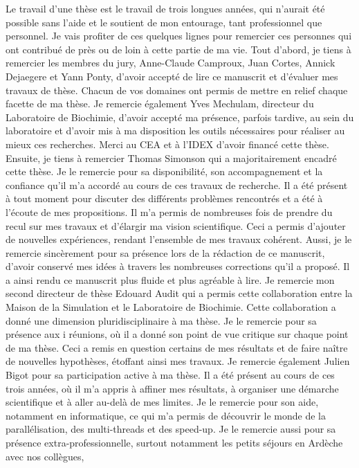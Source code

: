 Le travail d’une thèse est le travail de trois longues années, qui n’aurait été possible
sans l’aide et le soutient de mon entourage, tant professionnel que personnel. Je vais
profiter de ces quelques lignes pour remercier ces personnes qui ont contribué de près ou
de loin à cette partie de ma vie.
Tout d’abord, je tiens à remercier les membres du jury, Anne-Claude Camproux, Juan
Cortes, Annick Dejaegere et Yann Ponty, d’avoir accepté de lire ce manuscrit et d’évaluer
mes travaux de thèse. Chacun de vos domaines ont permis de mettre en relief chaque
facette de ma thèse. Je remercie également Yves Mechulam, directeur du Laboratoire de
Biochimie, d’avoir accepté ma présence, parfois tardive, au sein du laboratoire et d’avoir
mis à ma disposition les outils nécessaires pour réaliser au mieux ces recherches. Merci au
CEA et à l’IDEX d’avoir financé cette thèse.
Ensuite, je tiens à remercier Thomas Simonson qui a majoritairement encadré cette
thèse. Je le remercie pour sa disponibilité, son accompagnement et la confiance qu’il
m’a accordé au cours de ces travaux de recherche. Il a été présent à tout moment pour
discuter des différents problèmes rencontrés et a été à l’écoute de mes propositions. Il
m’a permis de nombreuses fois de prendre du recul sur mes travaux et d’élargir ma vision
scientifique. Ceci a permis d’ajouter de nouvelles expériences, rendant l’ensemble de mes
travaux cohérent. Aussi, je le remercie sincèrement pour sa présence lors de la rédaction
de ce manuscrit, d’avoir conservé mes idées à travers les nombreuses corrections qu’il a
proposé. Il a ainsi rendu ce manuscrit plus fluide et plus agréable à lire.
Je remercie mon second directeur de thèse Edouard Audit qui a permis cette collaboration
entre la Maison de la Simulation et le Laboratoire de Biochimie. Cette collaboration
a donné une dimension pluridisciplinaire à ma thèse. Je le remercie pour sa présence aux
i
réunions, où il a donné son point de vue critique sur chaque point de ma thèse. Ceci a
remis en question certains de mes résultats et de faire naître de nouvelles hypothèses,
étoffant ainsi mes travaux.
Je remercie également Julien Bigot pour sa participation active à ma thèse. Il a été
présent au cours de ces trois années, où il m’a appris à affiner mes résultats, à organiser
une démarche scientifique et à aller au-delà de mes limites. Je le remercie pour
son aide, notamment en informatique, ce qui m’a permis de découvrir le monde de la
parallélisation, des multi-threads et des speed-up. Je le remercie aussi pour sa présence
extra-professionnelle, surtout notamment les petits séjours en Ardèche avec nos collègues,
